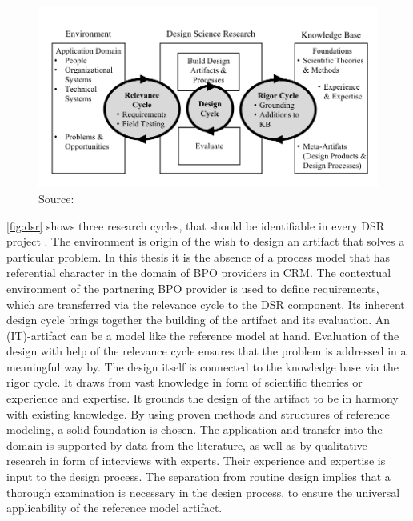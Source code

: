 			
\begin{figure}[caption={Design science research cycles}, label={fig:dsr}]
	{	\includegraphics[width=.8\textwidth]{figures/dsr.pdf}
	Source: \citep{Hevner2010}}
\end{figure}

\Fig \ref{fig:dsr} shows three research cycles, that should be identifiable in every \acrshort{DSR} project \citep{Hevner2010}. The environment is origin of the wish to design an artifact that solves a particular problem. In this thesis it is the absence of a process model that has referential character in the domain of \acrshort{BPO} providers in \acrshort{CRM}. The contextual environment of the partnering  \acrshort{BPO} provider is used to define requirements, which are transferred via the relevance cycle to the \acrshort{DSR} component. Its inherent design cycle brings together the building of the artifact and its evaluation. An (IT)-artifact can be a model \citep{Hevner2010} like the reference model at hand. Evaluation of the design with help of the relevance cycle ensures that the problem is addressed in a meaningful way by. The design itself is connected to the knowledge base via the rigor cycle. It draws from vast knowledge in form of scientific theories or experience and expertise. It grounds the design of the artifact to be in harmony with existing knowledge. By using proven methods and structures of reference modeling, a solid foundation is chosen. The application and transfer into the domain is supported by data from the literature, as well as by qualitative research in form of interviews with experts. Their experience and expertise is input to the design process. The separation from routine design implies that a thorough examination is necessary in the design process, to ensure the universal applicability of the reference model artifact. 




